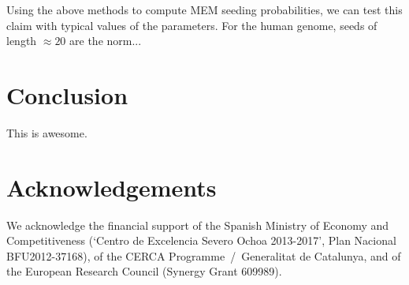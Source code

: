 \documentclass{article}
\begin{document}
Using the above methods to compute MEM seeding probabilities, we can test
this claim with typical values of the parameters. For the human genome,
seeds of length $\approx 20$ are the norm...


\section{Conclusion}

This is awesome.

\section*{Acknowledgements}

We acknowledge the financial support of the Spanish Ministry of Economy
and Competitiveness (‘Centro de Excelencia Severo Ochoa 2013-2017’, Plan
Nacional BFU2012-37168), of the CERCA Programme~/~Generalitat de
Catalunya, and of the European Research Council (Synergy Grant 609989).






\end{document}
